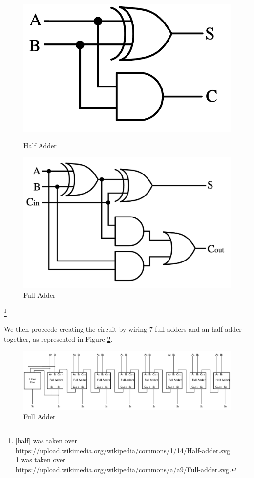 \documentclass[12pt]{article}
\begin{document}
\begin{figure}[!htb]
    \begin{minipage}{0.48\textwidth}
        \centering
        \includegraphics[width=.7\linewidth]{../src/images/Half_adder.png}
        \caption{Half Adder}\label{half}
    \end{minipage}
    \hfill
    \begin{minipage}{0.48\textwidth}
        \centering
        \includegraphics[width=.8\linewidth]{../src/images/Full-adder.png}
        \caption{Full Adder}\label{full}
    \end{minipage}
\end{figure}

\footnote{\ref{half} was taken over \url{https://upload.wikimedia.org/wikipedia/commons/1/14/Half-adder.svg}\\ 
\ref{full} was taken over \url{https://upload.wikimedia.org/wikipedia/commons/a/a9/Full-adder.svg}.}

We then proceede creating the circuit by wiring 7 full adders and an half adder together, as represented in Figure \ref{circuit}.

\begin{figure}[]
    \centering
    \includegraphics[width=1\linewidth]{../src/images/Circuit.png}
    \caption{Full Adder}\label{circuit}
\end{figure}
\end{document}
